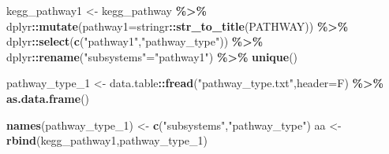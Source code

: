 \documentclass[
]{book}
\newenvironment{Shaded}{\begin{snugshade}}{\end{snugshade}}
\newcommand{\AttributeTok}[1]{\textcolor[rgb]{0.13,0.29,0.53}{#1}}
\newcommand{\FunctionTok}[1]{\textcolor[rgb]{0.13,0.29,0.53}{\textbf{#1}}}
\newcommand{\NormalTok}[1]{#1}
\newcommand{\OtherTok}[1]{\textcolor[rgb]{0.56,0.35,0.01}{#1}}
\newcommand{\SpecialCharTok}[1]{\textcolor[rgb]{0.81,0.36,0.00}{\textbf{#1}}}
\newcommand{\StringTok}[1]{\textcolor[rgb]{0.31,0.60,0.02}{#1}}
\begin{document}
\begin{Shaded}
\begin{Highlighting}[]
\NormalTok{kegg\_pathway1 }\OtherTok{\textless{}{-}}\NormalTok{ kegg\_pathway }\SpecialCharTok{\%\textgreater{}\%}
\NormalTok{  dplyr}\SpecialCharTok{::}\FunctionTok{mutate}\NormalTok{(}\AttributeTok{pathway1=}\NormalTok{stringr}\SpecialCharTok{::}\FunctionTok{str\_to\_title}\NormalTok{(PATHWAY)) }\SpecialCharTok{\%\textgreater{}\%}
\NormalTok{  dplyr}\SpecialCharTok{::}\FunctionTok{select}\NormalTok{(}\FunctionTok{c}\NormalTok{(}\StringTok{"pathway1"}\NormalTok{,}\StringTok{"pathway\_type"}\NormalTok{)) }\SpecialCharTok{\%\textgreater{}\%}
\NormalTok{  dplyr}\SpecialCharTok{::}\FunctionTok{rename}\NormalTok{(}\StringTok{"subsystems"}\OtherTok{=}\StringTok{"pathway1"}\NormalTok{) }\SpecialCharTok{\%\textgreater{}\%}
  \FunctionTok{unique}\NormalTok{()}

\NormalTok{pathway\_type\_1 }\OtherTok{\textless{}{-}}\NormalTok{ data.table}\SpecialCharTok{::}\FunctionTok{fread}\NormalTok{(}\StringTok{"pathway\_type.txt"}\NormalTok{,}\AttributeTok{header=}\NormalTok{F) }\SpecialCharTok{\%\textgreater{}\%}
  \FunctionTok{as.data.frame}\NormalTok{()}

\FunctionTok{names}\NormalTok{(pathway\_type\_1) }\OtherTok{\textless{}{-}} \FunctionTok{c}\NormalTok{(}\StringTok{"subsystems"}\NormalTok{,}\StringTok{"pathway\_type"}\NormalTok{)}
\NormalTok{aa }\OtherTok{\textless{}{-}} \FunctionTok{rbind}\NormalTok{(kegg\_pathway1,pathway\_type\_1)}


\end{Highlighting}
\end{Shaded}
\end{document}
